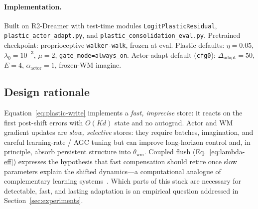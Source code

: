 \paragraph{Implementation.}
Built on R2-Dreamer with test-time modules \texttt{LogitPlasticResidual}, \texttt{plastic\_actor\_adapt.py}, and \texttt{plastic\_consolidation\_eval.py}.
Pretrained checkpoint: proprioceptive \texttt{walker-walk}, frozen at eval.
Plastic defaults: $\eta=0.05$, $\lambda_0=10^{-3}$, $\mu=2$, \texttt{gate\_mode=always\_on}.
Actor-adapt default (\texttt{cfg0}): $\Delta_{\mathrm{adapt}}=50$, $E=4$, $\alpha_{\mathrm{actor}}=1$, frozen-WM imagine.

\subsection{Design rationale}
\label{sec:rationale}

Equation~\eqref{eq:plastic-write} implements a \emph{fast, imprecise} store: it reacts on the first post-shift errors with $O(Kd)$ state and no autograd.
Actor and WM gradient updates are \emph{slow, selective} stores: they require batches, imagination, and careful learning-rate / AGC tuning but can improve long-horizon control and, in principle, absorb persistent structure into $\theta_{\mathrm{wm}}$.
Coupled flush (Eq.~\eqref{eq:lambda-eff}) expresses the hypothesis that fast compensation should retire once slow parameters explain the shifted dynamics---a computational analogue of complementary learning systems~\cite{mcclelland1995complementary}.
Which parts of this stack are necessary for detectable, fast, and lasting adaptation is an empirical question addressed in Section~\ref{sec:experiments}.
